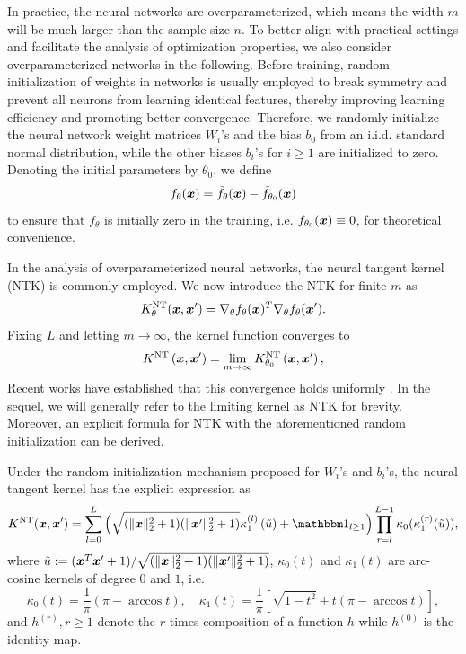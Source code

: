 In practice, the neural networks are overparameterized, which means the width $m$ will be much larger than the sample size $n$. 
To better align with practical settings and facilitate the analysis of optimization properties, we also consider overparameterized networks in the following. 
Before training, random initialization of weights in networks is usually employed to break symmetry and prevent all neurons from learning identical features, thereby improving learning efficiency and promoting better convergence. 
Therefore, we randomly initialize the neural network weight matrices $W_i$'s and the bias $b_0$ from an i.i.d. standard normal distribution, while the other biases $b_i$'s for $i \geq 1$ are initialized to zero. 
Denoting the initial parameters by $\theta_0$, we define
$$
f_{\theta}(\boldsymbol{x}) = \tilde{f}_{\theta}(\boldsymbol{x}) - \tilde{f}_{\theta_{0}}(\boldsymbol{x})
$$
to ensure that $f_{\theta}$ is initially zero in the training, i.e. $f_{\theta_{0}}(\boldsymbol{x}) \equiv 0$, for theoretical convenience. 



In the analysis of overparameterized neural networks, the neural tangent kernel (NTK) \citep{jacot2018neural,arora2019exact} is commonly employed.
We now introduce the NTK for finite $m$ as 
$$
   K^{\mathrm{NT}}_{\theta} (\boldsymbol{x},\boldsymbol{x}') = \nabla_{\theta} f_{\theta}(\boldsymbol{x})  ^{T} \nabla_{\theta} f_{\theta}(\boldsymbol{x}') .
$$
Fixing $L$ and letting $m \to \infty$, the kernel function converges to 
$$
K^{\mathrm{NT}} \left(\boldsymbol{x}, \boldsymbol{x}'\right) = \lim _{m \rightarrow \infty} K^{\mathrm{NT}}_{\theta_{0}}\left(\boldsymbol{x}, \boldsymbol{x}'\right), 
$$
Recent works have established that this convergence holds uniformly \citep{lai2023generalization}. 
In the sequel, we will generally refer to the limiting kernel as NTK for brevity. 
Moreover, an explicit formula for NTK with the aforementioned random initialization can be derived. 
\begin{proposition}\label{prop:explicit}
Under the random initialization mechanism proposed for $W_i$'s and $b_i$'s, the neural tangent kernel has the explicit expression as 
\begin{equation}\label{equ:101}
    \kont (\xx, \xx' ) = \sum_{l=0}^{L} \Big( \sqrt{ (\|\xx\|_2^2+1) (\|\xx ' \|_2^2+1) }
    \kappa_1^{(l)} \left( \tilde{u} \right) + \idicator_{l\geq 1} \Big) \prod_{r=l}^{L-1}\kappa_0(\kappa_1^{(r)}(\tilde{u})),
\end{equation}
where 
 $
\tilde{u} := %
({\xx}^{T}{\xx}' + 1)/\sqrt{ (\|\xx\|_2^2+1) (\|\xx ' \|_2^2+1) }$, 
$\kappa_0(t)$ and $\kappa_1(t)$ are arc-cosine kernels of degree $0$ and $1$, i.e. 
$$
\kappa_0(t)=\frac{1}{\pi}(\pi-\arccos t), \quad \kappa_1(t)=\frac{1}{\pi}\left[\sqrt{1-t^2}+t(\pi-\arccos t)\right], 
$$
and $h^{(r)}, r \geq 1$ denote the $r$-times composition of a function $h$ %
while $h^{(0)}$ is the identity map. 
\end{proposition}

